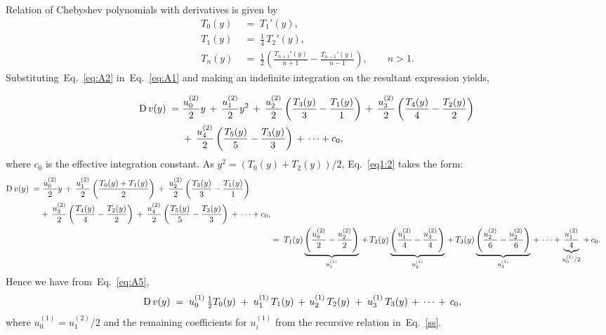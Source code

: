 \documentclass[%
secnumarabic,%
 amssymb, amsmath,%
 aps,prf,superscriptaddress,longbibliography
frontmatterverbose,
]{revtex4-2}
\begin{document}
Relation of Chebyshev polynomials with derivatives is given by~\cite[Equation 3.25]{chebExpanExact}
\begin{subequations}\label{eq:A2}
\begin{align}
  T_0(y) \;&=\; T_1'(y),\\
  T_1(y) \;&=\; \tfrac{1}{4}\,T_2'(y),\\
  T_n(y) \;&=\; \tfrac{1}{2}\left( \frac{T_{n+1}'(y)}{n+1} - \frac{T_{n-1}'(y)}{n-1}\right), \qquad n > 1.
\end{align}
\end{subequations}
Substituting~Eq.~\eqref{eq:A2} in~Eq.~\eqref{eq:A1} and making an indefinite integration on the resultant expression yields,

\begin{align}\label{eq1:2}
  \begin{split}
    \mathrm D\,v(y) \;=&\; \frac{u^{(2)}_0}{2}y \,+ \, \frac{u^{(2)}_1}{2}y^2 \,+\,\frac{u^{(2)}_2}{2}\left(\frac{T_3(y)}{3} - \frac{T_1(y)}{1}\right) \,+\,\frac{u^{(2)}_3}{2}\left(\frac{T_4(y)}{4} - \frac{T_2(y)}{2}\right)\,\\
    &\;+\,\frac{u^{(2)}_4}{2}\left(\frac{T_5(y)}{5} - \frac{T_3(y)}{3}\right)\,+\, \cdots + c_0,
  \end{split}
\end{align}
where $c_0$ is the effective integration constant.
As $y^2 = (T_0(y)+T_2(y))/2$, Eq.~\eqref{eq1:2} takes the form:
\begin{align}
  \begin{split}
  \mathrm D\,v(y)\;=&\; \frac{u^{(2)}_0}{2}y \,+\, \frac{u^{(2)}_1}{2} \left(\frac{T_0(y) + T_1(y)}{2}\right) \,+\,\frac{u^{(2)}_2}{2}\left(\frac{T_3(y)}{3} - \frac{T_1(y)}{1}\right) \,\\&+\,\frac{u^{(2)}_3}{2}\left(\frac{T_4(y)}{4} - \frac{T_2(y)}{2}\right)\,+\,\frac{u^{(2)}_4}{2}\left(\frac{T_5(y)}{5} - \frac{T_3(y)}{3}\right)\,+\, \cdots + c_0,
\end{split} \\
  &=\; T_1(y)\underbrace{\left(\frac{u^{(2)}_0}{2} - \frac{u^{(2)}_2}{2}\right)}_{u^{(1)}_1} \,+\,T_2(y)\underbrace{\left(\frac{u^{(2)}_1}{4} - \frac{u^{(2)}_3}{4} \right)}_{u^{(1)}_2} \,+\,T_3(y)\underbrace{\left(\frac{u^{(2)}_2}{6} - \frac{u^{(2)}_2}{6}\right)}_{u^{(1)}_3} \,+\,\cdots + \underbrace{\frac{u^{(2)}_1}{4}}_{u^{(1)}_0/2} \,+\, c_0.\label{eq:A5}
\end{align}
Hence we have from~Eq.~\eqref{eq:A5},
\begin{align}
  \mathrm D\, v(y) \;&=\; u^{(1)}_0 \,\tfrac{1}{2}T_0(y) \;+\; u^{(1)}_1\,T_1(y) \,+\, u^{(1)}_2\,T_2(y) \;+\; u^{(1)}_3\,T_3(y) \,+\, \cdots \,+\, c_0,
\end{align}
where $u^{(1)}_0 = u^{(2)}_1/2$ and the remaining coefficients for $u^{(1)}_i$ from the recursive relation in~Eq.~\eqref{ss}.

\newpage

\singlespacing

\end{document}
